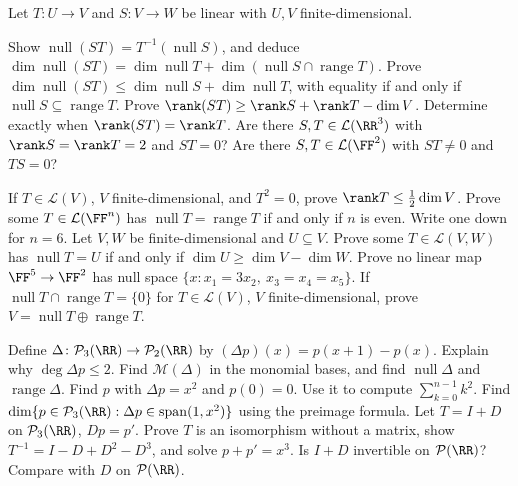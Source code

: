 \documentclass[11pt]{scrartcl}
\DeclareMathOperator{\nul}{null}
\DeclareMathOperator{\range}{range}
\DeclareMathOperator{\spn}{span}
\newcommand{\LL}{\mathcal L}
\newcommand{\PP}{\mathcal P}
\newcommand{\MM}{\mathcal M}
\begin{document}
\begin{problem}
  Let $T\colon U\to V$ and $S\colon V\to W$ be linear with $U,V$ finite-dimensional.
  \begin{enumerate}[(a)]
    \ii Show $\nul(ST)=T^{-1}(\nul S)$, and deduce
    $\dim\nul(ST)=\dim\nul T+\dim(\nul S\cap\range T)$.
    \ii Prove $\dim\nul(ST)\le\dim\nul S+\dim\nul T$, with equality if and only if $\nul S\subseteq\range T$.
    \ii Prove $\rank(ST)\ge\rank S+\rank T-\dim V$.
    Determine exactly when $\rank(ST)=\rank T$.
    \ii Are there $S,T\in\LL(\RR^3)$ with $\rank S=\rank T=2$ and $ST=0$?
    Are there $S,T\in\LL(\FF^2)$ with $ST\ne0$ and $TS=0$?
  \end{enumerate}
\end{problem}

\begin{problem}
  \leavevmode
  \begin{enumerate}[(a)]
    \ii If $T\in\LL(V)$, $V$ finite-dimensional, and $T^2=0$, prove $\rank T\le\frac12\dim V$.
    \ii Prove some $T\in\LL(\FF^n)$ has $\nul T=\range T$ if and only if $n$ is even.
    Write one down for $n=6$.
    \ii Let $V,W$ be finite-dimensional and $U\subseteq V$.
    Prove some $T\in\LL(V,W)$ has $\nul T=U$ if and only if $\dim U\ge\dim V-\dim W$.
    \ii Prove no linear map $\FF^5\to\FF^2$ has null space $\{x: x_1=3x_2,\ x_3=x_4=x_5\}$.
    \ii If $\nul T\cap\range T=\{0\}$ for $T\in\LL(V)$, $V$ finite-dimensional, prove $V=\nul T\oplus\range T$.
  \end{enumerate}
\end{problem}

\begin{problem}
  \leavevmode
  \begin{enumerate}[(a)]
    \ii Define $\Delta\colon\PP_3(\RR)\to\PP_2(\RR)$ by $(\Delta p)(x)=p(x+1)-p(x)$.
    Explain why $\deg\Delta p\le2$.
    Find $\MM(\Delta)$ in the monomial bases, and find $\nul\Delta$ and $\range\Delta$.
    \ii Find $p$ with $\Delta p=x^2$ and $p(0)=0$. Use it to compute $\sum_{k=0}^{n-1}k^2$.
    \ii Find $\dim\{p\in\PP_3(\RR):\Delta p\in\spn(1,x^2)\}$ using the preimage formula.
    \ii Let $T=I+D$ on $\PP_3(\RR)$, $Dp=p'$.
    Prove $T$ is an isomorphism without a matrix, show $T^{-1}=I-D+D^2-D^3$, and solve $p+p'=x^3$.
    \ii Is $I+D$ invertible on $\PP(\RR)$? Compare with $D$ on $\PP(\RR)$.
  \end{enumerate}
\end{problem}
\end{document}
